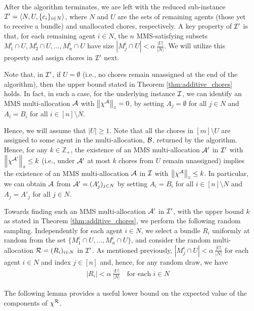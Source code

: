 After the algorithm terminates, we are left with the reduced sub-instance $\mathcal{I}' = \langle N, U, \{c_i\}_{i\in N}\rangle$, where $N$ and $U$ are the sets of remaining agents (those yet to receive a bundle) and unallocated chores, respectively. A key property of $\mathcal{I}'$ is that, for each remaining agent $i \in N$, the $n$ MMS-satisfying subsets $M^i_1 \cap U, M^i_2 \cap U, \ldots, M^i_n \cap U$ have size $|M^i_j \cap U| < \alpha \  \frac{|U|}{|N|}$. We will utilize this property and assign chores in $\mathcal{I}'$ next. 

Note that, in $\mathcal{I}'$, if $U = \emptyset$ (i.e., no chores remain unassigned at the end of the algorithm), then the upper bound stated in Theorem \ref{thm:additive_chores} holds. In fact, in such a case, for the underlying instance $\mathcal{I}$, we can identify an MMS multi-allocation $\mathcal{A}$ with $\left\|\chi^{\mathcal{A}}\right\|_z=0$, by setting $A_j = \emptyset$ for all $j \in N$ and $A_i = B_i$ for all $i \in [n] \setminus N$. 

Hence, we will assume that $|U|\geq 1$. Note that all the chores in $[m]\setminus U$ are assigned to some agent in the multi-allocation, $\mathcal{B}$, returned by the algorithm. Hence, for any $k \in \mathbb{Z}_+$, the existence of an MMS multi-allocation $\mathcal{A}'$ in $\mathcal{I}'$ with $\left\|\chi^{\mathcal{A}'}\right\|_z \leq k$ (i.e., under $\mathcal{A}'$ at most $k$ chores from $U$ remain unassigned) implies the existence of an MMS multi-allocation $\mathcal{A}$ in $\mathcal{I}$ with $\left\|\chi^{\mathcal{A}}\right\|_z \leq k$. In particular, we can obtain $\mathcal{A}$ from $\mathcal{A}'=(A'_j)_{j \in N}$ by setting $A_i = B_i$ for all $i \in [n] \setminus N$ and $A_j = A'_j$ for all $j \in N$. 

Towards finding such an MMS multi-allocation $\mathcal{A}'$ in $\mathcal{I}'$, with the upper bound $k$ as stated in Theorem \ref{thm:additive_chores}, we perform the following random sampling. Independently for each agent $i\in N$, we select a bundle $R_i$ uniformly at random from the set $\{M^i_1\cap U,\dots,M^i_n\cap U\}$, and consider the random multi-allocation $\mathcal{R}=(R_i)_{i\in N}$ in $\mathcal{I}'$. As mentioned previously, $ |M^i_j \cap U| < \alpha \  \frac{|U|}{|N|}$ for each agent $i \in N$ and index $j \in [n]$ and, hence, for any random draw, we have   
\begin{align}
    |R_i| < \alpha \ \frac{|U|}{|N|} \quad \text{for each $i \in N$} \label{ineq:sizeR}
\end{align}   

The following lemma provides a useful lower bound on the expected value of the components of $\chi^{\mathcal{R}}$.

